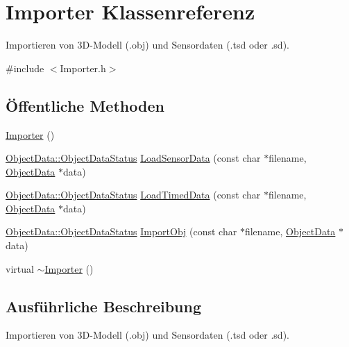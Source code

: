 \hypertarget{classImporter}{\section{Importer Klassenreferenz}
\label{classImporter}
}


Importieren von 3\-D-\/\-Modell (.obj) und Sensordaten (.tsd oder .sd).  




{\ttfamily \#include $<$Importer.\-h$>$}

\subsection*{Öffentliche Methoden}
\begin{DoxyCompactItemize}
\item 
\hyperlink{classImporter_afaf93b56e3558a92405ab627ab8ee1d1}{Importer} ()
\item 
\hyperlink{classObjectData_a20e8cd3cd0f8af3b571b9393aa9e6484}{Object\-Data\-::\-Object\-Data\-Status} \hyperlink{classImporter_a001bd26372d94f96de66f7bcb90cc790}{Load\-Sensor\-Data} (const char $\ast$filename, \hyperlink{classObjectData}{Object\-Data} $\ast$data)
\item 
\hyperlink{classObjectData_a20e8cd3cd0f8af3b571b9393aa9e6484}{Object\-Data\-::\-Object\-Data\-Status} \hyperlink{classImporter_a196e66a161a0102194580ec4b10895e5}{Load\-Timed\-Data} (const char $\ast$filename, \hyperlink{classObjectData}{Object\-Data} $\ast$data)
\item 
\hyperlink{classObjectData_a20e8cd3cd0f8af3b571b9393aa9e6484}{Object\-Data\-::\-Object\-Data\-Status} \hyperlink{classImporter_a5013417fb7556dce65dba1ed3aec4e50}{Import\-Obj} (const char $\ast$filename, \hyperlink{classObjectData}{Object\-Data} $\ast$data)
\item 
virtual \hyperlink{classImporter_a6e61faae5020f2dc034ff3ea4032a537}{$\sim$\-Importer} ()
\end{DoxyCompactItemize}


\subsection{Ausführliche Beschreibung}
Importieren von 3\-D-\/\-Modell (.obj) und Sensordaten (.tsd oder .sd). 

